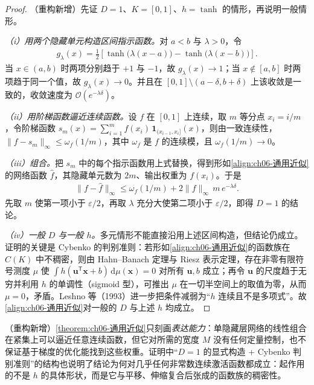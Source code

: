 \documentclass[../../main.tex]{subfiles}
\begin{document}
\begin{proof}
（重构新增）先证 $D=1$、$K=[0,1]$、$h=\tanh$ 的情形，再说明一般情形。

\emph{（i）用两个隐藏单元构造区间指示函数。}对 $a<b$ 与 $\lambda>0$，令
\begin{align*}
g_{\lambda}(x)=\frac{1}{2}\left[\tanh\bigl(\lambda(x-a)\bigr)-\tanh\bigl(\lambda(x-b)\bigr)\right].
\end{align*}
当 $x\in(a,b)$ 时两项分别趋于 $+1$ 与 $-1$，故 $g_\lambda(x)\to1$；当 $x\notin[a,b]$ 时两项趋于同一个值，故 $g_\lambda(x)\to0$。并且在 $[0,1]\setminus(a-\delta,b+\delta)$ 上该收敛是一致的，收敛速度为 $\mathcal{O}(e^{-\lambda\delta})$。

\emph{（ii）用阶梯函数逼近连续函数。}设 $f$ 在 $[0,1]$ 上连续，取 $m$ 等分点 $x_i=i/m$，令阶梯函数 $s_m(x)=\sum_{i=1}^{m}f(x_i)\,\mathbf{1}_{(x_{i-1},x_i]}(x)$，则由一致连续性，$\|f-s_m\|_{\infty}\leqslant\omega_f(1/m)$，其中 $\omega_f$ 是 $f$ 的连续模，且 $\omega_f(1/m)\to0$。

\emph{（iii）组合。}把 $s_m$ 中的每个指示函数用上式替换，得到形如\eqref{align:ch06-通用近似}的网络函数 $\hat f$，其隐藏单元数为 $2m$、输出权重为 $f(x_i)$。于是
\begin{align}
\|f-\hat f\|_{\infty}\leqslant\omega_f(1/m)+2\|f\|_{\infty}\,m\,e^{-\lambda\delta}.
\end{align}
先取 $m$ 使第一项小于 $\varepsilon/2$，再取 $\lambda$ 充分大使第二项小于 $\varepsilon/2$，即得 $D=1$ 的结论。

\emph{（iv）一般 $D$ 与一般 $h$。}多元情形不能直接沿用上述区间构造，但结论仍成立。证明的关键是 Cybenko 的判别准则：若形如\eqref{align:ch06-通用近似}的函数族在 $C(K)$ 中不稠密，则由 Hahn--Banach 定理与 Riesz 表示定理，存在非零有限符号测度 $\mu$ 使 $\int h(\boldsymbol{u}^{\mathsf T}\boldsymbol{x}+b)\,\mathrm{d}\mu(\boldsymbol{x})=0$ 对所有 $\boldsymbol{u},b$ 成立；再令 $\boldsymbol{u}$ 的尺度趋于无穷并利用 $h$ 的单调性（sigmoid 型），可推出 $\mu$ 在一切半空间上的取值为零，从而 $\mu=0$，矛盾。Leshno 等（1993）进一步把条件减弱为“$h$ 连续且不是多项式”。故\eqref{align:ch06-通用近似}对一般的 $D$ 与上述 $h$ 均成立。
\end{proof}

\begin{remark}（重构新增）\cref{theorem:ch06-通用近似}只刻画\emph{表达能力}：单隐藏层网络的线性组合在紧集上可以逼近任意连续函数，但它对所需的宽度 $M$ 没有任何定量控制，也不保证基于梯度的优化能找到这些权重。证明中“$D=1$ 的显式构造 + Cybenko 判别准则”的结构也说明了结论为何对几乎任何非常数连续激活函数都成立：起作用的不是 $h$ 的具体形状，而是它与平移、伸缩复合后张成的函数族的稠密性。
\end{remark}
\end{document}

